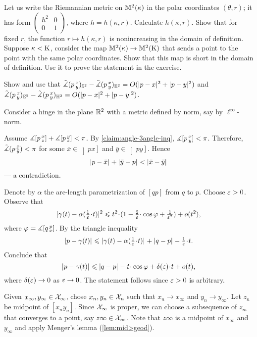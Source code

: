 Let us write the Riemannian metric on $\mathbb{M}^2(\kappa)$ in the polar coordinates $(\theta,r)$;
it has form 
$(\begin{smallmatrix}
h^2&0
\\
0&1
\end{smallmatrix})$, where $h=h(\kappa,r)$.
Calculate $h(\kappa,r)$.
Show that for fixed $r$, the function $r\mapsto h(\kappa,r)$ is nonincreasing in the domain of definition.
Suppose $\kappa<\mathrm{K}$, consider the map $\mathbb{M}^2(\kappa)\to\mathbb{M}^2(\mathrm{K})$ that sends a point to the point with the same polar coordinates.
Show that this map is short in the domain of definition.
Use it to prove the statement in the exercise.


 Show and use that 
$\angk p{x}{y}_{\SSS^2}-\angk p{x}{y}_{\EE^2}=O(\dist[2]{p}{x}{}+\dist[2]{p}{y}{})$
and 
$\angk p{x}{y}_{\EE^2}-\angk p{x}{y}_{\HH^2}=O(\dist[2]{p}{x}{}+\dist[2]{p}{y}{})$.

Consider a hinge in the plane $\mathbb{R}^2$ with a metric defined by norm, say by $\ell^\infty$-norm.

Assume $\measuredangle[p\,{}^{x}_{z}]+\measuredangle[p\,{}^{y}_{z}]<\pi$.
By \ref{claim:angle-3angle-inq}, $\measuredangle[p\,{}^{x}_{y}]<\pi$.
Therefore,
$\tilde\measuredangle(p\,{}^{\bar x}_{\bar y})<\pi$
for some $\bar x\in \left]px\right]$ and $\bar y\in \left]py\right]$.
Hence 
\[\dist p{\bar x}{}+\dist {\bar y}p{}<\dist {\bar x}{\bar y}{}\]
--- a contradiction.

Denote by $\alpha$ the arc-length parametrization of $[qp]$ from $q$ to $p$.
Choose $\varepsilon>0$.
Observe that 
\[\dist[2]{\gamma(t)}{\alpha(\tfrac1\eps\cdot t)}{}\le t^2\cdot(1-\tfrac2\eps\cdot\cos\phi+\tfrac1{\eps^2})+o(t^2),\]
where $\varphi=\measuredangle[q\,{}^{p}_{x}]$.
By the triangle  inequality
\[\dist{p}{\gamma(t)}{}\le \dist{\gamma(t)}{\alpha(\tfrac1\eps\cdot t)}{}+\dist{q}{p}{}-\tfrac1\eps\cdot t.\]
Conclude that
\[\dist{p}{\gamma(t)}{}
\le
\dist{q}{p}{}-t\cdot \cos \phi+\delta(\eps)\cdot t+o(t),\]
where $\delta(\varepsilon)\to 0$ as $\varepsilon\to0$.
The statement follows since $\varepsilon>0$ is arbitrary.

Given $x_\infty,y_\infty\in\mathcal{X}_\infty$, chose $x_n,y_n\in \mathcal{X}_n$ such that $x_n\to x_\infty$ and $y_n\to y_\infty$.
Let $z_n$ be midpoint of $[x_ny_n]$.
Since $\mathcal{X}_\infty$ is proper, we can choose a subsequence of $z_m$ that converges to a point, say $z\infty\in \mathcal{X}_\infty$.
Note that $z\infty$ is a midpoint of $x_\infty$ and $y_\infty$ and apply Menger's lemma (\ref{lem:mid>geod}).

